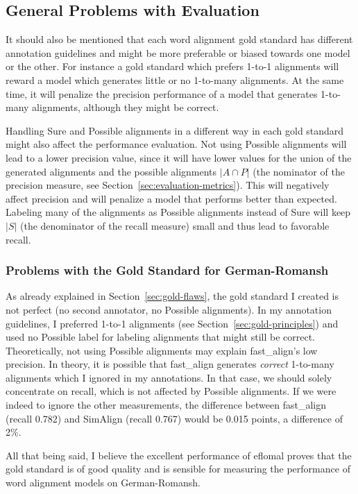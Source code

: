 \subsection{General Problems with Evaluation}
\label{sec:problems-evaluation}
It should also be mentioned that each word alignment gold standard has different annotation guidelines and might be more preferable or biased towards one model or the other. 
For instance a gold standard which prefers 1-to-1 alignments will reward a model which generates little or no 1-to-many alignments. 
At the same time, it will penalize the precision performance of a model that generates 1-to-many alignments, although they might be correct.

Handling Sure and Possible alignments in a different way in each gold standard might also affect the performance evaluation. 
Not using Possible alignments will lead to a lower precision value, since it will have lower values for the union of the generated alignments and the possible alignments $|A \cap P|$ (the nominator of the precision measure, see Section~\ref{sec:evaluation-metrics}). This will negatively affect precision and will penalize a model that performs better than expected. 
Labeling many of the alignments as Possible alignments instead of Sure will keep $|S|$ (the denominator of the recall measure) small and thus lead to favorable recall. 


\subsubsection{Problems with the Gold Standard for German-Romansh}
As already explained in Section~\ref{sec:gold-flaws}, the gold standard I created is not perfect (no second annotator, no Possible alignments). 
In my annotation guidelines, I preferred 1-to-1 alignments (see Section~\ref{sec:gold-principles}) and used no Possible label for labeling alignments that might still be correct.
Theoretically, not using Possible alignments may explain fast\_align's low precision. 
In theory, it is possible that fast\_align generates \emph{correct} 1-to-many alignments which I ignored in my annotations. 
In that case, we should solely concentrate on recall, which is not affected by Possible alignments. 
If we were indeed to ignore the other measurements, the difference between fast\_align (recall 0.782) and SimAlign (recall 0.767) would be 0.015 points, a difference of 2\%.

All that being said, I believe the excellent performance of eflomal proves that the gold standard is of good quality and is sensible for measuring the performance of word alignment models on German-Romansh.



